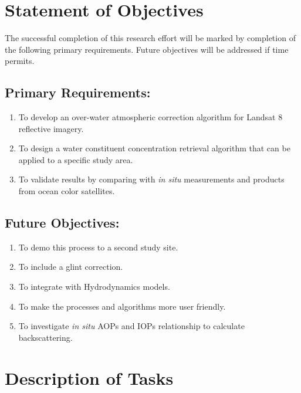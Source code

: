 \section{Statement of Objectives}
\label{sec:objectives}
The successful completion of this research effort will be marked by completion of the following primary requirements. Future objectives will be addressed if time permits.

\subsection{Primary Requirements:}
\begin{enumerate}
	\item To develop an over-water atmospheric correction algorithm for Landsat 8 reflective imagery.
	\item To design a water constituent concentration retrieval algorithm that can be applied to a specific study area.
	\item To validate results by comparing with {\it in situ} measurements and products from ocean color satellites.
\end{enumerate}

\subsection{Future Objectives:}
\begin{enumerate}
	\item To demo this process to a second study site.
	\item To include a glint correction.
	\item To integrate with Hydrodynamics models.
	\item To make the processes and algorithms more user friendly.
	\item To investigate {\it in situ} AOPs and IOPs relationship to calculate backscattering.
\end{enumerate}
\section{Description of Tasks}
\label{sec:tasks}

